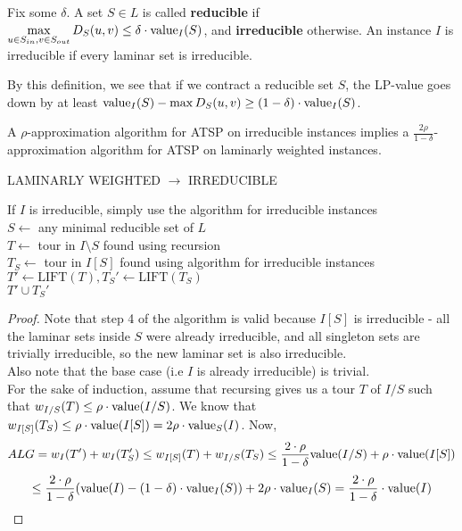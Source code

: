 \documentclass[./main.tex]{subfiles}
\begin{document}
\begin{definition}
Fix some $\delta$. A set $S\in L$ is called \textbf{reducible} if $\max\limits_{u\in S_{in}, v\in S_{out}}D_S(u,v)\leq \delta\cdot \textup{value}_I(S)$, and \textbf{irreducible} otherwise. An instance $I$ is irreducible if every laminar set is irreducible.
\end{definition}
By this definition, we see that if we contract a reducible set $S$, the LP-value goes down by at least $\textup{value}_I(S) - \max D_S(u,v)\geq(1-\delta)\cdot \textup{value}_I(S)$.\vspace{4mm}
\begin{theorem} A $\rho$-approximation algorithm for ATSP on irreducible instances implies a $\frac{2\rho}{1-\delta}$-approximation algorithm for ATSP on laminarly weighted instances.
\end{theorem}
\begin{algorithm}\label{alg:1}
	\caption{LAMINARLY WEIGHTED $\rightarrow$ IRREDUCIBLE}
    If $I$ is irreducible, simply use the algorithm for irreducible instances\\
	$S\leftarrow$ any minimal reducible set of $L$\\
	$T\leftarrow$ tour in $I\setminus S$ found using recursion\\
	$T_S\leftarrow$ tour in $I[S]$ found using algorithm for irreducible instances\\
    $T'\leftarrow \text{LIFT}(T), T_S'\leftarrow \text{LIFT}(T_S)$\\
	\Return $T'\cup T_S'$
\end{algorithm}
\begin{proof}
Note that step 4 of the algorithm is valid because $I[S]$ is irreducible - all the laminar sets inside $S$ were already irreducible, and all singleton sets are trivially irreducible, so the new laminar set is also irreducible.
\\Also note that the base case (i.e $I$ is already irreducible) is trivial.\vspace{2mm}
\\For the sake of induction, assume that recursing gives us a tour $T$ of $I/S$ such that $w_{I/S}(T)\leq \rho\cdot \textup{value}(I/S)$. We know that $w_{I[S]}(T_S)\leq \rho\cdot \textup{value}(I[S]) = 2\rho\cdot\textup{value}_S(I)$. Now, $$ALG = w_I(T') + w_I(T_S')\leq w_{I[S]}(T) + w_{I/S}(T_S)\leq \frac{2\cdot\rho}{1-\delta}\textup{value}(I/S) + \rho\cdot \textup{value}(I[S])$$ $$\leq \frac{2\cdot\rho}{1-\delta}(\textup{value}(I) - (1-\delta)\cdot \textup{value}_I(S)) + 2\rho\cdot \textup{value}_I(S)= \frac{2\cdot\rho}{1-\delta}\cdot \textup{value}(I) $$
\end{proof}
\end{document}
